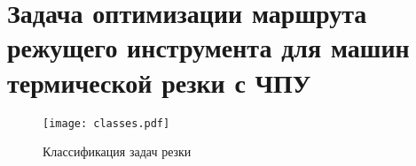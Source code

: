 
\chapter{
  Задача оптимизации маршрута
  режущего инструмента
  для машин термической резки с ЧПУ
}
\label{ch:review}

\lipsum

\begin{figure}
  \centering
  \texttt{[image: classes.pdf]}
  \caption{Классификация задач резки}
  \label{fig:cut-classes}
\end{figure}


